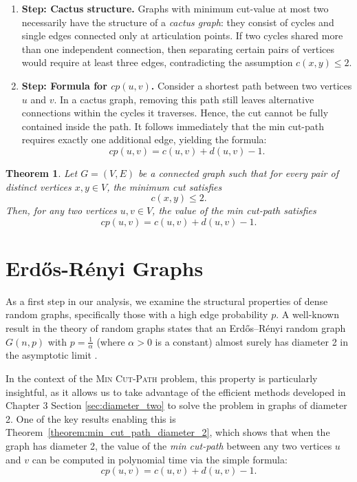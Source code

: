 \documentclass[journal ]{new-aiaa}
\numberwithin{equation}{section}
\theoremstyle{definition}
\theoremstyle{plain}
\newtheorem{theorem}[definition]{Theorem}
\theoremstyle{remark}
\begin{document}
\begin{enumerate}

    \item \textbf{Step: Cactus structure.}
    Graphs with minimum cut-value at most two necessarily have the structure of a \emph{cactus graph}\cite{Mehlhorn2016Certifying}: they consist of cycles and single edges connected only at articulation points. If two cycles shared more than one independent connection, then separating certain pairs of vertices would require at least three edges, contradicting the assumption \(c(x,y) \leq 2\).
    
    \item \textbf{Step: Formula for \(cp(u,v)\).}  
    Consider a shortest path between two vertices \(u\) and \(v\). In a cactus graph, removing this path still leaves alternative connections within the cycles it traverses. Hence, the cut cannot be fully contained inside the path. It follows immediately that the min cut-path requires exactly one additional edge, yielding the formula:
\[
cp(u,v) = c(u,v) + d(u,v) - 1.
\]
\end{enumerate}



\begin{theorem}
\label{thm:min_cut_path_max_2}
Let \(G = (V, E)\) be a connected graph such that for every pair of distinct vertices \(x, y \in V\), the minimum cut satisfies 
\[
c(x, y) \leq 2.
\]  
Then, for any two vertices \(u,v \in V\), the value of the min cut-path satisfies
\[
cp(u, v) = c(u, v) + d(u, v) - 1.
\]
\end{theorem}









\section{Erdős-Rényi Graphs}
\label{sec:Diameter}

As a first step in our analysis, we examine the structural properties of dense random graphs, specifically those with a high edge probability \( p \). A well-known result in the theory of random graphs states that an Erdős–Rényi random graph \( G(n, p) \) with \( p = \frac{1}{\alpha} \) (where \( \alpha > 0 \) is a constant) almost surely has diameter 2 in the asymptotic limit \cite{Bollobas2001}. 

In the context of the \textsc{Min Cut-Path} problem, this property is particularly insightful, as it allows us to take advantage of the efficient methods developed in Chapter 3 Section \ref{sec:diameter_two} to solve the problem in graphs of diameter 2. One of the key results enabling this is Theorem~\ref{theorem:min_cut_path_diameter_2}, which shows that when the graph has diameter 2, the value of the \textit{min cut-path} between any two vertices \(u\) and \(v\) can be computed in polynomial time via the simple formula:
\[
cp(u, v) = c(u, v) + d(u, v) - 1.
\]
\end{document}
